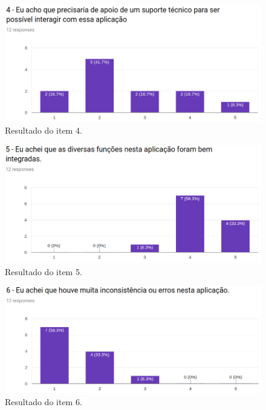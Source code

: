 \begin{figure}[!ht]
    \centering
    \includegraphics[scale=0.5]{./figuras/q4.png}
    \caption{Resultado do item 4.}
    \label{fig:q4}
\end{figure}

\begin{figure}[!ht]
    \centering
    \includegraphics[scale=0.5]{./figuras/q5.png}
    \caption{Resultado do item 5.}
    \label{fig:q5}
\end{figure}

\begin{figure}[!ht]
    \centering
    \includegraphics[scale=0.5]{./figuras/q6.png}
    \caption{Resultado do item 6.}
    \label{fig:q6}
\end{figure}

